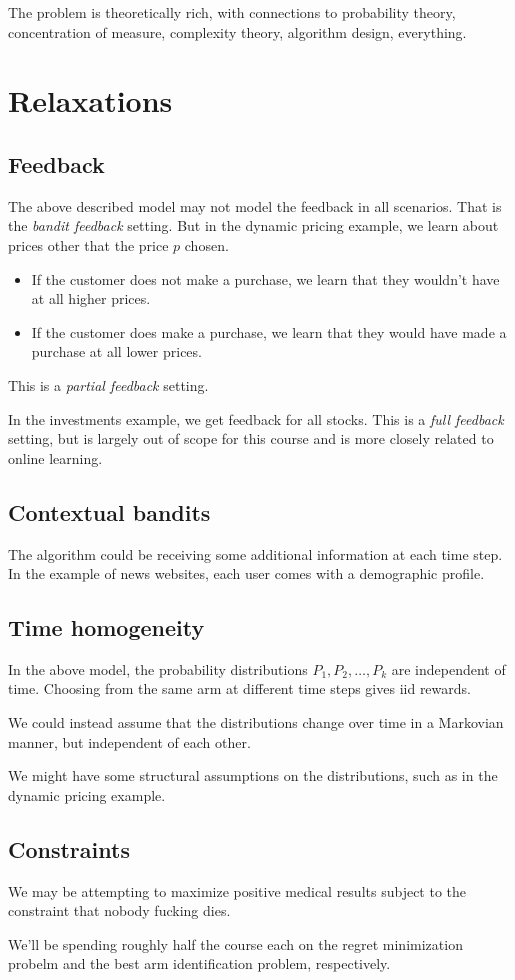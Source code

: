 The problem is theoretically rich, with connections to probability theory,
concentration of measure, complexity theory, algorithm design, everything.

\section*{Relaxations}

\subsection*{Feedback}
The above described model may not model the feedback in all scenarios.
That is the \emph{bandit feedback} setting.
But in the dynamic pricing example, we learn about prices other that the
price $p$ chosen.
\begin{itemize}
    \item If the customer does not make a purchase, we learn that they
        wouldn't have at all higher prices.
    \item If the customer does make a purchase, we learn that they would
        have made a purchase at all lower prices.
\end{itemize}
This is a \emph{partial feedback} setting.

In the investments example, we get feedback for all stocks.
This is a \emph{full feedback} setting, but is largely out of scope for
this course and is more closely related to online learning.

\subsection*{Contextual bandits}
The algorithm could be receiving some additional information at each time
step.
In the example of news websites, each user comes with a demographic profile.

\subsection*{Time homogeneity}
In the above model, the probability distributions $P_1, P_2, \dots, P_k$ are
independent of time.
Choosing from the same arm at different time steps gives iid rewards.

We could instead assume that the distributions change over time in a
Markovian manner, but independent of each other.

We might have some structural assumptions on the distributions, such as in
the dynamic pricing example.

\subsection*{Constraints}
We may be attempting to maximize positive medical results subject to the
constraint that nobody fucking dies.

We'll be spending roughly half the course each on the regret minimization
probelm and the best arm identification problem, respectively.

